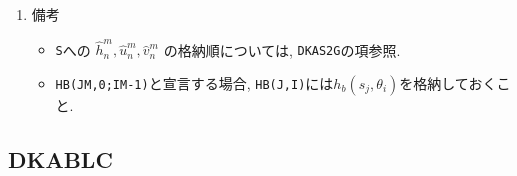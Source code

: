 \documentclass[a4j,fleqn]{jarticle}
\begin{document}
\begin{enumerate}
\item 備考

\begin{itemize}

\item {\tt S}への
$\hat h^m_n,\hat u^m_n,\hat v^m_n$
の格納順については, {\tt DKAS2G}の項参照.

\item {\tt HB(JM,0;IM-1)}と宣言する場合,
   {\tt HB(J,I)}には$h_b(s_j,\theta_i)$を格納しておくこと.
\end{itemize}

\end{enumerate}


\subsection{DKABLC}
\end{document}
